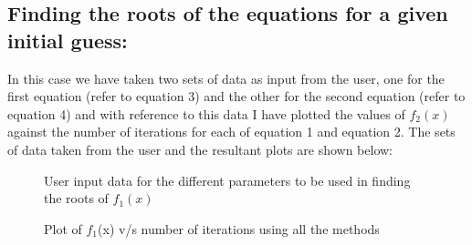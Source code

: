 \documentclass[12pt,a4paper]{article}
\begin{document}
\subsection{Finding the roots of the equations for a given initial guess:}
In this case we have taken two sets of data as input from the user, one for the first equation (refer to equation 3) and the other for the second equation (refer to equation 4) and with reference to this data I have plotted the values of $\text{$f_2$}(x)$ against the number of iterations for each of equation 1 and equation 2. The sets of data taken from the user and the resultant plots are shown below:
\clearpage
\begin{figure}[!ht]
	\begin{center}
	\end{center}
	\caption{User input data for the different parameters to be used in finding the roots of $f_1(x)$}
\end{figure}
\begin{figure}[!ht]
	\begin{center}
	\end{center}
	\caption{Plot of $f_1$(x) v/s number of iterations using all the methods}
\end{figure}
\end{document}
